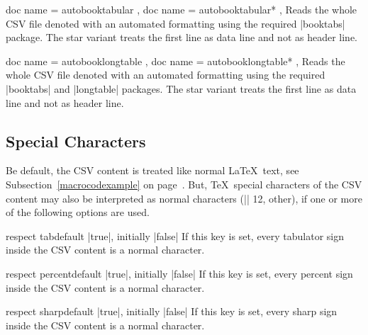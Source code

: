 \documentclass[a4paper,11pt]{ltxdoc}
\begin{document}
\begin{docCsvKeys}[
    doc parameter   = {=\meta{file name}},
    doc description = no default,
  ]
  {
    { doc name = autobooktabular  },
    { doc name = autobooktabular* },
  }
  Reads the whole CSV file denoted  with an automated formatting
  using the required |booktabs| package.
  The star variant treats the first line as data line and not as header line.
\end{docCsvKeys}


\begin{docCsvKeys}[
    doc parameter   = {=\meta{file name}},
    doc description = no default,
  ]
  {
    { doc name = autobooklongtable  },
    { doc name = autobooklongtable* },
  }
  Reads the whole CSV file denoted  with an automated formatting
  using the required |booktabs| and |longtable| packages.
  The star variant treats the first line as data line and not as header line.
\end{docCsvKeys}


\clearpage
\subsection{Special Characters}\label{subsec:specchar}
Be default, the CSV content is treated like normal \LaTeX\ text, see
Subsection~\ref{macrocodexample} on page~\pageref{macrocodexample}.
But, \TeX\ special characters of the CSV content may also be interpreted
as normal characters (|\catcode| 12, other), if one or more of the following options are used.

\begin{docCsvKey}{respect tab}{}{default |true|, initially |false|}
  If this key is set, every
  tabulator sign
  inside the CSV content is a normal character.
\end{docCsvKey}

\begin{docCsvKey}{respect percent}{}{default |true|, initially |false|}
  If this key is set, every
  percent sign \verbbox{\%}
  inside the CSV content is a normal character.
\end{docCsvKey}

\begin{docCsvKey}{respect sharp}{}{default |true|, initially |false|}
  If this key is set, every
  sharp sign \verbbox{\#}
  inside the CSV content is a normal character.
\end{docCsvKey}
\end{document}
